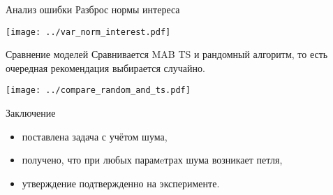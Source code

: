 \documentclass{beamer}
\begin{document}
\begin{frame}{Анализ ошибки}
Разброс нормы интереса
\begin{center}
  \texttt{[image: ../var\_norm\_interest.pdf]}
\end{center}
\end{frame}
\begin{frame}{Сравнение моделей}
Сравнивается MAB TS и рандомный алгоритм, то есть очередная рекомендация выбирается случайно.
\begin{center}
  \texttt{[image: ../compare\_random\_and\_ts.pdf]}
\end{center}
\end{frame}
\begin{frame}{Заключение}
  \begin{itemize}
      \item поставлена задача с учётом шума,
      \item получено, что при любых парамeтрах шума возникает петля,  
      \item утверждение подтвержденно на эксперименте.
  \end{itemize}
\end{frame}
\end{document}
